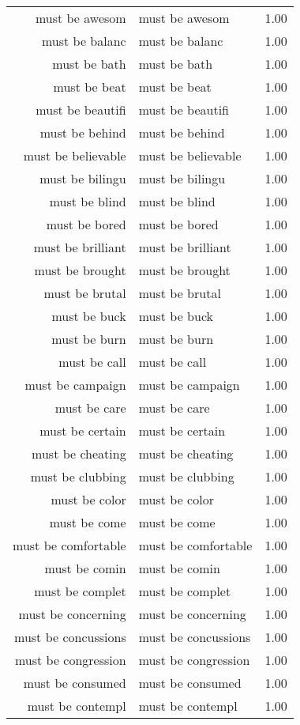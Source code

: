 \begin{table}[ht]
\begin{tabular}{rlr}
  must be awesom & must be awesom & 1.00 \\ 
  must be balanc & must be balanc & 1.00 \\ 
  must be bath & must be bath & 1.00 \\ 
  must be beat & must be beat & 1.00 \\ 
  must be beautifi & must be beautifi & 1.00 \\ 
  must be behind & must be behind & 1.00 \\ 
  must be believable & must be believable & 1.00 \\ 
  must be bilingu & must be bilingu & 1.00 \\ 
  must be blind & must be blind & 1.00 \\ 
  must be bored & must be bored & 1.00 \\ 
  must be brilliant & must be brilliant & 1.00 \\ 
  must be brought & must be brought & 1.00 \\ 
  must be brutal & must be brutal & 1.00 \\ 
  must be buck & must be buck & 1.00 \\ 
  must be burn & must be burn & 1.00 \\ 
  must be call & must be call & 1.00 \\ 
  must be campaign & must be campaign & 1.00 \\ 
  must be care & must be care & 1.00 \\ 
  must be certain & must be certain & 1.00 \\ 
  must be cheating & must be cheating & 1.00 \\ 
  must be clubbing & must be clubbing & 1.00 \\ 
  must be color & must be color & 1.00 \\ 
  must be come & must be come & 1.00 \\ 
  must be comfortable & must be comfortable & 1.00 \\ 
  must be comin & must be comin & 1.00 \\ 
  must be complet & must be complet & 1.00 \\ 
  must be concerning & must be concerning & 1.00 \\ 
  must be concussions & must be concussions & 1.00 \\ 
  must be congression & must be congression & 1.00 \\ 
  must be consumed & must be consumed & 1.00 \\ 
  must be contempl & must be contempl & 1.00 \\ 

\end{tabular}
\end{table}
